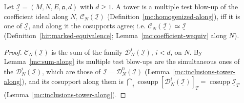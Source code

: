 \begin{theorem}
\label{mc:coefficient-equivalent-along}
\leanok
Let \(\underline{\mathcal I}=(M,N,E,\mathfrak a,d)\) with \(d\ge1\). A tower is a multiple test blow-up of the coefficient ideal along \(N\), \(\mathcal C_N(\underline{\mathcal I})\)
(Definition~\ref{mc:homogenized-along}), iff it is one of \(\underline{\mathcal I}\), and along it the cosupports agree; i.e.
\(\mathcal C_N(\underline{\mathcal I})\simeq\underline{\mathcal I}\) (Definition~\ref{hir:marked-equivalence}; Lemma~\ref{mc:coefficient-wequiv} along \(N\)).
\end{theorem}
\begin{proof}
\leanok
\(\mathcal C_N(\underline{\mathcal I})\) is the sum of the family \(\mathcal D_N^i(\underline{\mathcal I})\), \(i<d\), on \(N\). By Lemma~\ref{mc:sum-along} its multiple test blow-ups
are the simultaneous ones of the \(\mathcal D_N^i(\underline{\mathcal I})\), which are those of \(\underline{\mathcal I}=\mathcal D_N^0(\underline{\mathcal I})\)
(Lemma~\ref{mc:inclusions-tower-along}), and its cosupport along them is \(\bigcap_i\operatorname{cosupp}[\mathcal D_N^i(\underline{\mathcal I})]_T=\operatorname{cosupp}\underline{\mathcal I}_T\)
(Lemma~\ref{mc:inclusions-tower-along}).
\end{proof}

